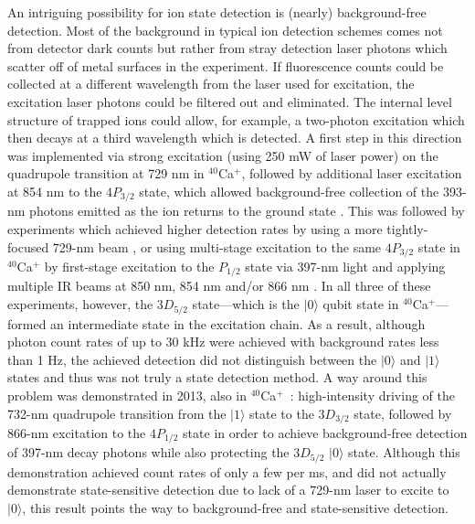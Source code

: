 \documentclass[%
12pt,
 amsmath,amssymb,
]{revtex4-2}
\newcommand{\zero}{|0 \rangle}
\newcommand{\one}{|1 \rangle}
\begin{document}
An intriguing possibility for ion state detection is (nearly) background-free detection. Most of the background in typical ion detection schemes comes not from detector dark counts but rather from stray detection laser photons which scatter off of metal surfaces in the experiment. If fluorescence counts could be collected at a different wavelength from the laser used for excitation, the excitation laser photons could be filtered out and eliminated. The internal level structure of trapped ions could allow, for example, a two-photon excitation which then decays at a third wavelength which is detected. A first step in this direction was implemented via strong excitation (using 250 mW of laser power) on the quadrupole transition at 729 nm in $^{40}$Ca$^+$, followed by additional laser excitation at 854 nm to the $4P_{3/2}$ state, which allowed background-free collection of the 393-nm photons emitted as the ion returns to the ground state \cite{HendricksIonBlaster2008}. This was followed by experiments which achieved higher detection rates by using a more tightly-focused 729-nm beam \cite{LindenfelserBackgroundFree2017},  or using multi-stage excitation to the same $4P_{3/2}$ state in $^{40}$Ca$^+$ by first-stage excitation to the $P_{1/2}$ state via 397-nm light and applying multiple IR beams at 850 nm, 854 nm and/or 866 nm \cite{LinkeBackgroundFree2012}. In all three of these experiments, however, the $3D_{5/2}$ state---which is the $\zero$ qubit state in $^{40}$Ca$^+$---formed an intermediate state in the excitation chain. As a result, although photon count rates of up to 30 kHz were achieved with background rates less than 1 Hz, the achieved detection did not distinguish between the $\zero$ and $\one$ states and thus was not truly a state detection method. A way around this problem was demonstrated in 2013, also in $^{40}$Ca$^+$~\cite{FeiBackgroundFree2013}: high-intensity driving of the 732-nm quadrupole transition from the $\one$ state to the $3D_{3/2}$ state, followed by 866-nm excitation to the $4P_{1/2}$ state in order to achieve background-free detection of 397-nm decay photons while also protecting the $3D_{5/2}$ $\zero$ state. Although this demonstration achieved count rates of only a few per ms, and did not actually demonstrate state-sensitive detection due to lack of a 729-nm laser to excite to $\zero$, this result points the way to background-free and state-sensitive detection.
\end{document}

